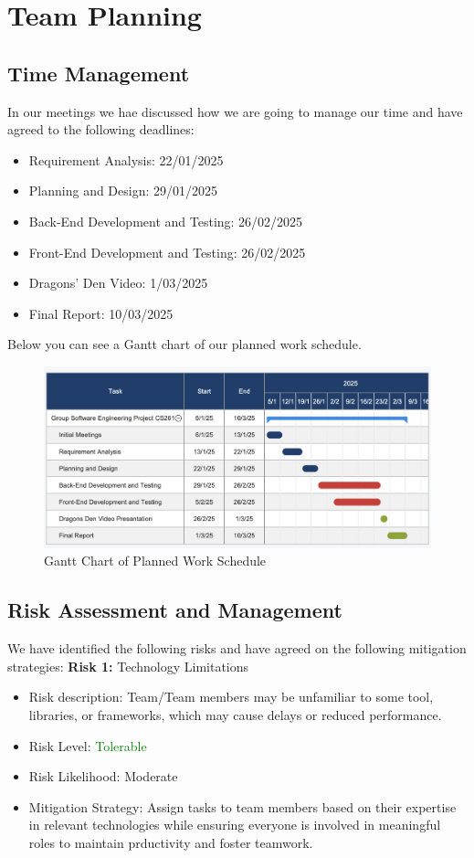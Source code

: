 \documentclass{article}
\begin{document}
\section{Team Planning}
\subsection{Time Management}
In our meetings we hae discussed how we are going to manage our time and have agreed to the following deadlines:

\begin{itemize}
    \item Requirement Analysis: 22/01/2025
    \item Planning and Design: 29/01/2025
    \item Back-End Development and Testing: 26/02/2025
    \item Front-End Development and Testing: 26/02/2025
    \item Dragons' Den Video: 1/03/2025
    \item Final Report: 10/03/2025
\end{itemize}

Below you can see a Gantt chart of our planned work schedule.

\begin{figure}[h!]
    \centering
    \includegraphics[width=\textwidth]{ganttchart.png}
    \caption{Gantt Chart of Planned Work Schedule}
    \label{fig:gantt_chart}
\end{figure}


\subsection{Risk Assessment and Management}
We have identified the following risks and have agreed on the following mitigation strategies:
\textbf{Risk 1:} Technology Limitations
\begin{itemize}
    \item Risk description: Team/Team members may be unfamiliar to some tool, libraries, or frameworks, which may cause delays or reduced performance. 
    \item Risk Level: \textcolor{Green}{Tolerable}
    \item Risk Likelihood: \textcolor{BurntOrange}{Moderate}
    \item Mitigation Strategy: Assign tasks to team members based on their expertise in relevant technologies while ensuring everyone is involved in meaningful roles to maintain prductivity and foster teamwork.
\end{itemize}
\end{document}
